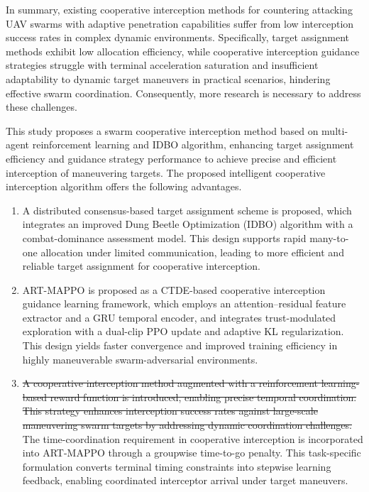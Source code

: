 \documentclass[lettersize,journal]{IEEEtran}
\newcommand{\hladd}[1]{{\color{blue}#1}}
\newcommand{\hldel}[1]{{\color{red}\sout{#1}}}
\begin{document}
In summary, existing cooperative interception methods for countering attacking UAV swarms with
adaptive penetration capabilities suffer from low interception success rates in complex dynamic
environments.
Specifically, target assignment methods exhibit low allocation efficiency, while cooperative
interception guidance strategies struggle with terminal acceleration saturation and insufficient
adaptability to dynamic target maneuvers in practical scenarios, hindering effective swarm
coordination.
Consequently, more research is necessary to address these challenges.

This study proposes a swarm cooperative interception method based on multi-agent reinforcement
learning and IDBO algorithm, enhancing target assignment efficiency and guidance strategy
performance to achieve precise and efficient interception of maneuvering targets.
The proposed intelligent cooperative interception algorithm offers the following advantages.

\begin{enumerate}
\item A distributed consensus-based target assignment scheme is proposed, which integrates an
improved Dung Beetle Optimization (IDBO) algorithm with a combat-dominance assessment model.
This design supports rapid many-to-one allocation under limited communication, leading to more
efficient and reliable target assignment for cooperative interception.

\item ART-MAPPO is proposed as a CTDE-based cooperative interception guidance learning
framework, which employs an attention--residual feature extractor and a GRU temporal encoder,
and integrates trust-modulated exploration with a dual-clip PPO update and adaptive KL
regularization. This design yields faster convergence and improved training efficiency in
highly maneuverable swarm-adversarial environments.


\item
\hldel{A cooperative interception method augmented with a reinforcement
learning-based reward function is introduced, enabling precise temporal
coordination. This strategy enhances interception success rates against
large-scale maneuvering swarm targets by addressing dynamic coordination
challenges.}
\hladd{The time-coordination requirement in cooperative interception is
incorporated into ART-MAPPO through a groupwise time-to-go penalty. This
task-specific formulation converts terminal timing constraints into
stepwise learning feedback, enabling coordinated interceptor arrival under
target maneuvers.}


\end{enumerate}
\end{document}
